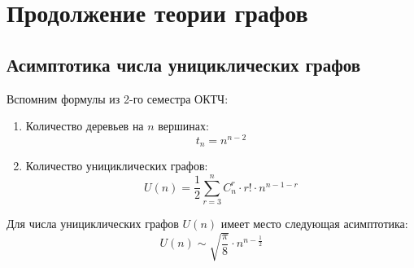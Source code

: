 \section{Продолжение теории графов}

\subsection{Асимптотика числа унициклических графов}

\begin{reminder}
Вспомним формулы из 2-го семестра ОКТЧ:
\begin{enumerate}

    \item Количество деревьев на $n$ вершинах: \[t_n = n^{n-2}\]
    \item Количество унициклических графов: \[
    U(n) = \frac{1}{2} \sum_{r = 3}^n C_n^r \cdot r! \cdot n^{n - 1 - r}
    \]
\end{enumerate}




\end{reminder}

\begin{proposition} \label{asympprop}
	Для числа унициклических графов $U(n)$ имеет место следующая асимптотика:
	\[
		U(n) \sim \sqrt{\frac{\pi}{8}} \cdot n^{n - \frac{1}{2}}
	\]
\end{proposition}

